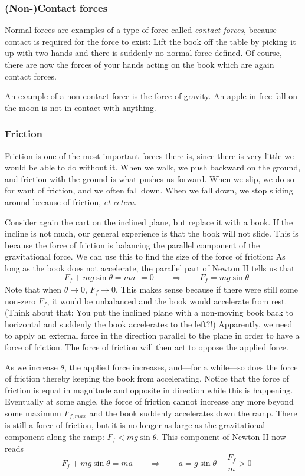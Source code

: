 \subsubsection{(Non-)Contact forces}

Normal forces are examples of a type of force called {\em contact forces}, because contact is required for the force to exist: Lift the book off the table by picking it up with two hands and there is suddenly no normal force defined. Of course, there are now the forces of your hands acting on the book which are again contact forces. 

An example of a non-contact force is the force of gravity. An apple in free-fall on the moon is not in contact with anything. 

\subsubsection{Friction}\label{S:Friction}
Friction is one of the most important forces there is, since there is very little we would be able to do without it. When we walk, we push backward on the ground, and friction with the ground is what pushes us forward. When we slip, we do so for want of friction, and we often fall down. When we fall down, we stop sliding around because of friction, {\it et cetera}. 


Consider again the cart on the inclined plane, but replace it with a book. If the incline is not much, our general experience is that the book will not slide. This is because the force of friction is balancing the parallel component of the gravitational force. We can use this to find the size of the force of friction: As long as the book does not accelerate, the parallel part of Newton II tells us that 
$$
- F_f + mg \sin θ = ma_\parallel = 0
\quad \quad ⇒ \quad \quad 
F_f  = mg \sin θ
$$
Note that when $θ→ 0$, $F_f → 0$. This makes sense because if there were still some non-zero $F_f$, it would be unbalanced and the book would accelerate from rest. (Think about that: You put the inclined plane with a non-moving book back to horizontal and suddenly the book accelerates to the left?!) Apparently, we need to apply an external force in the direction parallel to the plane in order to have a force of friction. The force of friction will then act to oppose the applied force. 

As we increase $θ$, the applied force increases, and---for a while---so does the force of friction thereby keeping the book from accelerating. Notice that the force of friction is equal in magnitude and opposite in direction while this is happening. 
Eventually at some angle, the force of friction cannot increase any more beyond some maximum $F_{f,max}$ and the book suddenly accelerates down the ramp. 
There is still a force of friction, but it is no longer as large as the gravitational component along the ramp: $F_f < mg \sin θ$. This component of Newton II now reads 
$$
-F_f + mg \sin θ = ma 
\quad \quad ⇒ \quad \quad 
a = g \sin θ - \frac {F_f}m > 0 
$$

